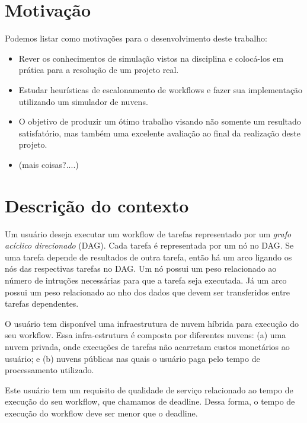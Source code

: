 \documentclass[a4paper,10pt]{article}
\begin{document}
\section{Motivação}

Podemos listar como motivações para o desenvolvimento deste trabalho:\\

\begin{itemize}

\item Rever os conhecimentos de simulação vistos na disciplina e colocá-los em prática para a resolução de um projeto real.

\item Estudar heurísticas de escalonamento de workflows e fazer sua implementação utilizando um simulador de nuvens.

\item O objetivo de produzir um ótimo trabalho visando não somente um resultado satisfatório, mas também uma excelente 
avaliação ao final da realização deste projeto.

\item (mais coisas?....)

\end{itemize}

\section{Descrição do contexto}

Um usuário deseja executar um workflow de tarefas representado por um \emph{grafo acíclico 
direcionado} (DAG). Cada tarefa é representada por um nó no DAG. Se uma tarefa depende de
resultados de outra tarefa, então há um arco ligando os nós das respectivas tarefas no DAG.
Um nó possui um peso relacionado ao número de intruções necessárias para que a tarefa seja executada.
Já um arco possui um peso relacionado ao nho dos dados que devem ser transferidos entre tarefas
dependentes.

O usuário tem disponível uma infraestrutura de nuvem híbrida para execução do 
seu workflow. Essa infra-estrutura é composta por diferentes nuvens: (a) uma nuvem 
privada, onde execuções de tarefas não acarretam custos monetários ao usuário; e (b) 
nuvens públicas nas quais o usuário paga pelo tempo de processamento utilizado.

Este usuário tem um requisito de qualidade de serviço relacionado 
ao tempo de execução do seu workflow, que chamamos de deadline. Dessa forma, o tempo 
de execução do workflow deve ser menor que o deadline.
\end{document}
